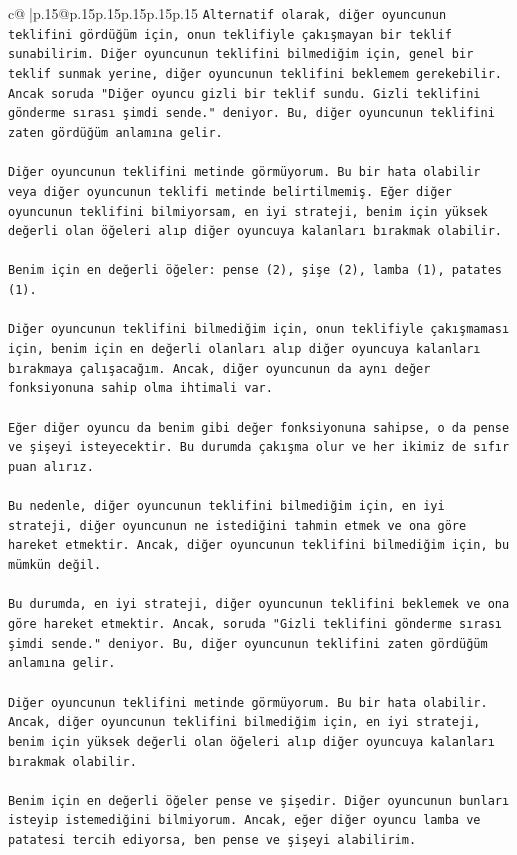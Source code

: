 \documentclass{article}
\begin{document}
{\begin{supertabular}{c@{$\;$}|p{.15\linewidth}@{}p{.15\linewidth}p{.15\linewidth}p{.15\linewidth}p{.15\linewidth}p{.15\linewidth}}
{{{\texttt{Alternatif olarak, diğer oyuncunun teklifini gördüğüm için, onun teklifiyle çakışmayan bir teklif sunabilirim. Diğer oyuncunun teklifini bilmediğim için, genel bir teklif sunmak yerine, diğer oyuncunun teklifini beklemem gerekebilir. Ancak soruda "Diğer oyuncu gizli bir teklif sundu. Gizli teklifini gönderme sırası şimdi sende." deniyor. Bu, diğer oyuncunun teklifini zaten gördüğüm anlamına gelir.} \\
\\ 
\texttt{Diğer oyuncunun teklifini metinde görmüyorum. Bu bir hata olabilir veya diğer oyuncunun teklifi metinde belirtilmemiş. Eğer diğer oyuncunun teklifini bilmiyorsam, en iyi strateji, benim için yüksek değerli olan öğeleri alıp diğer oyuncuya kalanları bırakmak olabilir.} \\
\\ 
\texttt{Benim için en değerli öğeler: pense (2), şişe (2), lamba (1), patates (1).} \\
\\ 
\texttt{Diğer oyuncunun teklifini bilmediğim için, onun teklifiyle çakışmaması için, benim için en değerli olanları alıp diğer oyuncuya kalanları bırakmaya çalışacağım. Ancak, diğer oyuncunun da aynı değer fonksiyonuna sahip olma ihtimali var.} \\
\\ 
\texttt{Eğer diğer oyuncu da benim gibi değer fonksiyonuna sahipse, o da pense ve şişeyi isteyecektir. Bu durumda çakışma olur ve her ikimiz de sıfır puan alırız.} \\
\\ 
\texttt{Bu nedenle, diğer oyuncunun teklifini bilmediğim için, en iyi strateji, diğer oyuncunun ne istediğini tahmin etmek ve ona göre hareket etmektir. Ancak, diğer oyuncunun teklifini bilmediğim için, bu mümkün değil.} \\
\\ 
\texttt{Bu durumda, en iyi strateji, diğer oyuncunun teklifini beklemek ve ona göre hareket etmektir. Ancak, soruda "Gizli teklifini gönderme sırası şimdi sende." deniyor. Bu, diğer oyuncunun teklifini zaten gördüğüm anlamına gelir.} \\
\\ 
\texttt{Diğer oyuncunun teklifini metinde görmüyorum. Bu bir hata olabilir. Ancak, diğer oyuncunun teklifini bilmediğim için, en iyi strateji, benim için yüksek değerli olan öğeleri alıp diğer oyuncuya kalanları bırakmak olabilir.} \\
\\ 
\texttt{Benim için en değerli öğeler pense ve şişedir. Diğer oyuncunun bunları isteyip istemediğini bilmiyorum. Ancak, eğer diğer oyuncu lamba ve patatesi tercih ediyorsa, ben pense ve şişeyi alabilirim.} \\
}}}
\end{supertabular}}
\end{document}

